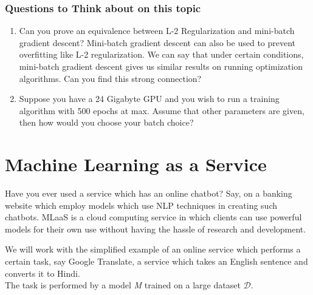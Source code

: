 \documentclass[12pt]{article}
\begin{document}
\subsubsection{Questions to Think about on this topic}
\begin{enumerate}
    \item Can you prove an equivalence between L-2 Regularization and mini-batch gradient descent? Mini-batch gradient descent can also be used to prevent overfitting like L-2 regularization. We can say that under certain conditions, mini-batch gradient descent gives us similar results on running optimization algorithms. Can you find this strong connection?
    \item Suppose you have a 24 Gigabyte GPU and you wish to run a training algorithm with 500 epochs at max. Assume that other parameters are given, then how would you choose your batch choice?
\end{enumerate}


\section{Machine Learning as a Service}
Have you ever used a service which has an online chatbot? Say, on a banking website which employ models which use NLP techniques in creating such chatbots. MLaaS is a cloud computing service in which clients can use powerful models for their own use without having the hassle of research and development.

We will work with the simplified example of an online service which performs a certain task, say Google Translate, a service which takes an English sentence and converts it to Hindi. \\
The task is performed by a model \textit{M} trained on a large dataset $\mathcal{D}$. 
\vspace{1cm}

\vspace{1cm}
\end{document}
